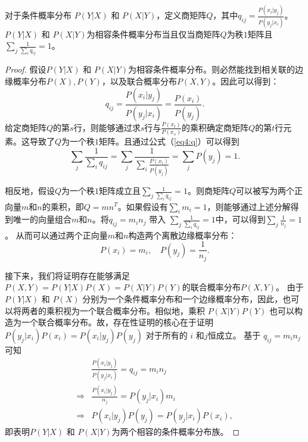 \begin{theorem}
    \label{thm4}
    对于条件概率分布 $P(Y|X)$ 和 $P(X|Y)$，定义商矩阵$Q$，其中${q}_{ij} = \frac{P(x_i|y_j)}{P(y_j|x_i)}$。$P(Y|X)$ 和 $P(X|Y)$为相容条件概率分布当且仅当商矩阵$Q$为秩$1$矩阵且$\sum_j\frac{1}{\sum_i {q}_{ij}} = 1$。
\end{theorem}
\begin{proof}
    假设$P(Y|X)$ 和 $P(X|Y)$为相容条件概率分布。则必然能找到相关联的边缘概率分布$P(X), P(Y)$，以及联合概率分布$P(X, Y)$。因此可以得到：
    \begin{equation}
    {q}_{ij} = \frac{P(x_i|y_j)}{P(y_j|x_i)} = \frac{P(x_i)}{P(y_j)}.
    \label{eq4:q}
    \end{equation}
    给定商矩阵$Q$的第$s$行，则能够通过求$s$行与$\frac{P(x_t)}{P(x_s)}$的乘积确定商矩阵$Q$的第$t$行元素。这导致了$Q$为一个秩$1$矩阵。且通过公式（\ref{eq4:q}）可以得到
    \begin{equation}
    \sum_j\frac{1}{\sum_i {q}_{ij}} = \sum_j\frac{1}{\sum_i \frac{P(x_i)}{P(y_j)}} = \sum_j P(y_j) = 1.
    \end{equation}

    相反地，假设$Q$为一个秩$1$矩阵成立且$\sum_j\frac{1}{\sum_i {q}_{ij}} = 1$。则商矩阵$Q$可以被写为两个正向量$m$和$n$的乘积，即$Q = mn^T$。如果假设有$\sum_i  {m}_i = 1$，则能够通过上述分解得到唯一的向量组合$m$和$n$。将${q}_{ij} ={ m}_i{n}_j$ 带入 $\sum_j\frac{1}{\sum_i {q}_{ij}} = 1$中，可以得到$\sum_j\frac{1}{{n}_j} = 1$。
    从而可以通过两个正向量$m$和$n$构造两个离散边缘概率分布：
    \begin{equation}
    P(x_i) = {m}_i, \quad P(y_j) = \frac{1}{{n}_j}.
    \end{equation}

    接下来，我们将证明存在能够满足 $P(X, Y) = P(Y|X)P(X) = P(X|Y)P(Y)$的联合概率分布$P(X, Y)$。
    由于$P(Y|X)$ 和 $P(X)$ 分别为一个条件概率分布和一个边缘概率分布，因此，也可以将两者的乘积视为一个联合概率分布。相似地，乘积 $P(X|Y)P(Y)$ 也可以构造为一个联合概率分布。故，存在性证明的核心在于证明 $P(y_j|x_i)P(x_i) = P(x_i|y_j)P(y_j)$ 对于所有的 $i$ 和$j$恒成立。
    基于 ${q}_{ij} = {m}_i{n}_j$可知
    \begin{equation}
    \begin{split}
    &\frac{P(x_i|y_j)}{P(y_j|x_i)} = {q}_{ij} = {m}_i{n}_j\\
    \Rightarrow &\frac{P(x_i|y_j)}{{n}_j} = P(y_j|x_i) {m}_i\\
    \Rightarrow &P(x_i|y_j)P(y_j) = P(y_j|x_i)P(x_i), 
    \end{split}
    \end{equation}
    即表明$P(Y|X)$ 和 $P(X|Y)$为两个相容的条件概率分布族。
\end{proof}

